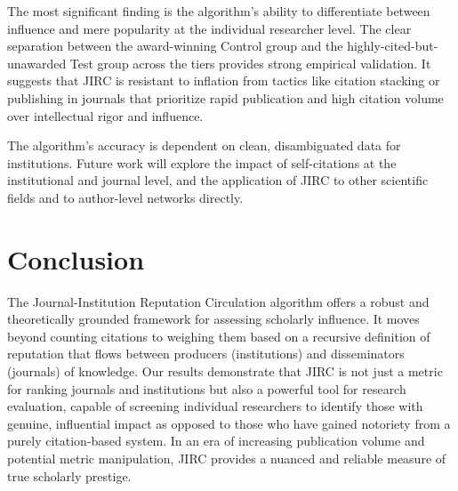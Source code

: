 \documentclass[10pt]{article}
\begin{document}
The most significant finding is the algorithm's ability to differentiate between influence and mere popularity at the individual researcher level. The clear separation between the award-winning Control group and the highly-cited-but-unawarded Test group across the tiers provides strong empirical validation. It suggests that JIRC is resistant to inflation from tactics like citation stacking or publishing in journals that prioritize rapid publication and high citation volume over intellectual rigor and influence.

The algorithm's accuracy is dependent on clean, disambiguated data for institutions. Future work will explore the impact of self-citations at the institutional and journal level, and the application of JIRC to other scientific fields and to author-level networks directly.
\section{Conclusion}

The Journal-Institution Reputation Circulation algorithm offers a robust and theoretically grounded framework for assessing scholarly influence. It moves beyond counting citations to weighing them based on a recursive definition of reputation that flows between producers (institutions) and disseminators (journals) of knowledge. Our results demonstrate that JIRC is not just a metric for ranking journals and institutions but also a powerful tool for research evaluation, capable of screening individual researchers to identify those with genuine, influential impact as opposed to those who have gained notoriety from a purely citation-based system. In an era of increasing publication volume and potential metric manipulation, JIRC provides a nuanced and reliable measure of true scholarly prestige.




\end{document}
